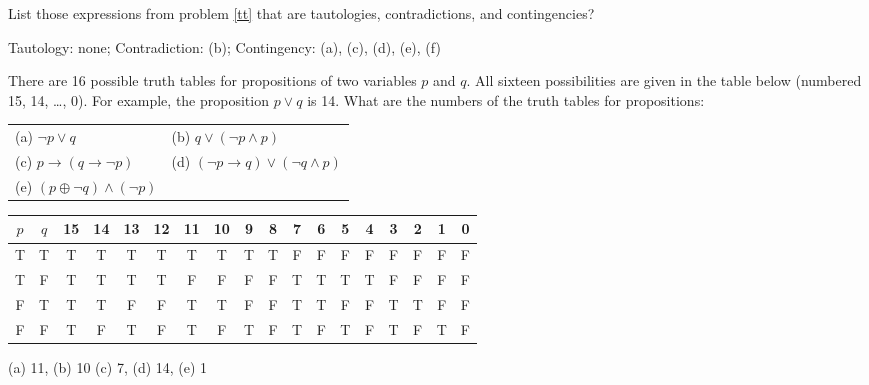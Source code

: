 \documentclass[11pt,addpoints]{exam}
\newcommand{\ra}{\rightarrow}
\begin{document}
\begin{questions}
\question[4] List those expressions from problem \ref{tt} that are tautologies, contradictions, and contingencies?
    \ifprintanswers
        \vspace{-15pt}
    \fi
    \begin{solution}
       Tautology:  none;
       Contradiction: (b);
       Contingency:  (a), (c), (d), (e), (f)
    \end{solution}

\question[10] There are 16 possible truth tables for propositions of two variables $p$ and $q$.
 All sixteen possibilities are given in the table below (numbered 15, 14, \ldots, 0).
 For example, the proposition $p \vee q$ is 14. What are the numbers of the truth
 tables for propositions:
     \ifprintanswers
        \vspace{-10pt}
    \fi
\begin{center}
 \begin{tabular}{ll}
    (a) $\neg p \vee q$ \quad 
    &  (b) $q \vee (\neg p \wedge p)$ \\
    (c) $p \ra (q \ra \neg p) $ \quad \quad
    & (d) $(\neg p \ra q) \vee (\neg q \wedge p)$ \\
    (e) $(p \oplus \neg q) \wedge (\neg p)$ \\
 \end{tabular}

 \footnotesize
 \begin{tabular}{cc|cccc|cccc|cccc|cccc}
    $p$ & $q$ & 15 & 14 & 13 & 12 & 11 & 10 & 9 & 8 & 7 & 6 & 5 & 4 & 3 & 2 & 1 & 0 \\
    \hline
    T & T & T & T & T & T & T & T & T & T & F & F & F & F & F & F & F & F \\
    T & F & T & T & T & T & F & F & F & F & T & T & T & T & F & F & F & F \\
    F & T & T & T & F & F & T & T & F & F & T & T & F & F & T & T & F & F \\
    F & F & T & F & T & F & T & F & T & F & T & F & T & F & T & F & T & F \\
 \end{tabular}
 \end{center}
 \normalsize
     \ifprintanswers
        \vspace{-15pt}
    \fi
    \begin{solution} (a) 11, (b) 10 (c) 7, (d) 14, (e) 1
    \end{solution}



\end{questions}
\end{document}
